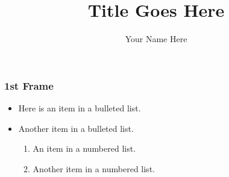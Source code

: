 \documentclass{beamer}
\title{Title Goes Here}
\author{Your Name Here}
\institute{MAGICC Lab \\ Brigham Young University}
\begin{document}
\begin{frame}
\titlepage
\end{frame}

\begin{frame} \frametitle{1st Frame}
  \begin{itemize}
	\item Here is an item in a bulleted list. 
	\item Another item in a bulleted list.
	\begin{enumerate}
		\item An item in a numbered list.
		\item Another item in a numbered list.
	\end{enumerate}
  \end{itemize}
\end{frame}
\end{document}

